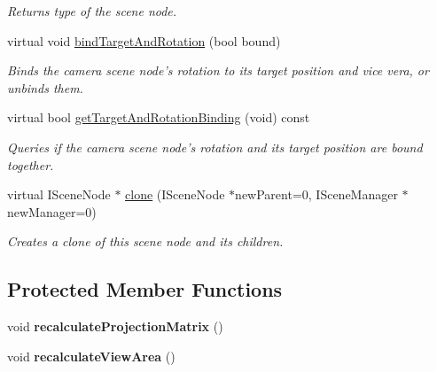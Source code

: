 \begin{DoxyCompactItemize}
\begin{DoxyCompactList}\small\item\em Returns type of the scene node. \end{DoxyCompactList}\item 
virtual void \hyperlink{classirr_1_1scene_1_1_c_camera_scene_node_a28fad5aaca2451574ed9e0544e165e3d}{bind\-Target\-And\-Rotation} (bool bound)
\begin{DoxyCompactList}\small\item\em Binds the camera scene node's rotation to its target position and vice vera, or unbinds them. \end{DoxyCompactList}\item 
virtual bool \hyperlink{classirr_1_1scene_1_1_c_camera_scene_node_a573cbc81603938876b199e681da85728}{get\-Target\-And\-Rotation\-Binding} (void) const 
\begin{DoxyCompactList}\small\item\em Queries if the camera scene node's rotation and its target position are bound together. \end{DoxyCompactList}\item 
\hypertarget{classirr_1_1scene_1_1_c_camera_scene_node_abc92a271a8e92d328a0397990732650a}{virtual I\-Scene\-Node $\ast$ \hyperlink{classirr_1_1scene_1_1_c_camera_scene_node_abc92a271a8e92d328a0397990732650a}{clone} (I\-Scene\-Node $\ast$new\-Parent=0, I\-Scene\-Manager $\ast$new\-Manager=0)}\label{classirr_1_1scene_1_1_c_camera_scene_node_abc92a271a8e92d328a0397990732650a}

\begin{DoxyCompactList}\small\item\em Creates a clone of this scene node and its children. \end{DoxyCompactList}\end{DoxyCompactItemize}
\subsection*{Protected Member Functions}
\begin{DoxyCompactItemize}
\item 
\hypertarget{classirr_1_1scene_1_1_c_camera_scene_node_aa0d18fa923a76eec54022586e78848b6}{void {\bfseries recalculate\-Projection\-Matrix} ()}\label{classirr_1_1scene_1_1_c_camera_scene_node_aa0d18fa923a76eec54022586e78848b6}

\item 
\hypertarget{classirr_1_1scene_1_1_c_camera_scene_node_ac2c437474c1380b8b3c78f7549b5b6c2}{void {\bfseries recalculate\-View\-Area} ()}\label{classirr_1_1scene_1_1_c_camera_scene_node_ac2c437474c1380b8b3c78f7549b5b6c2}

\end{DoxyCompactItemize}
